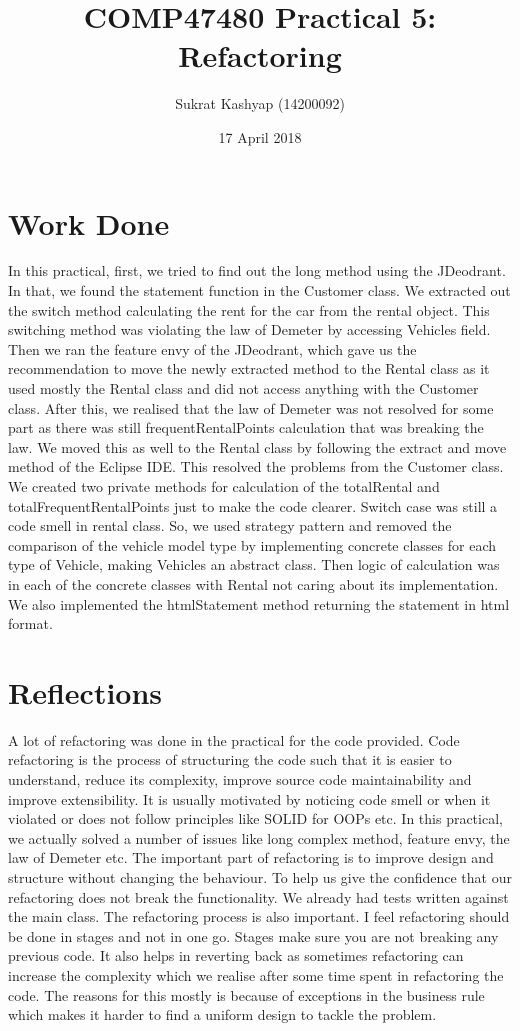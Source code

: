 \documentclass[11pt]{article}
\title{\vspace{-3.0cm}COMP47480 Practical 5: Refactoring}
\author{Sukrat Kashyap (14200092)}
\date{17 April 2018}
\begin{document}
\maketitle

\section{Work Done}

In this practical, first, we tried to find out the long method using the JDeodrant. In that, we found the statement function in the Customer class. We extracted out the switch method calculating the rent for the car from the rental object. This switching method was violating the law of Demeter by accessing Vehicles field. Then we ran the feature envy of the JDeodrant, which gave us the recommendation to move the newly extracted method to the Rental class as it used mostly the Rental class and did not access anything with the Customer class. After this, we realised that the law of Demeter was not resolved for some part as there was still frequentRentalPoints calculation that was breaking the law. We moved this as well to the Rental class by following the extract and move method of the Eclipse IDE. This resolved the problems from the Customer class. We created two private methods for calculation of the totalRental and totalFrequentRentalPoints just to make the code clearer. Switch case was still a code smell in rental class. So, we used strategy pattern and removed the comparison of the vehicle model type by implementing concrete classes for each type of Vehicle, making Vehicles an abstract class. Then logic of calculation was in each of the concrete classes with Rental not caring about its implementation. We also implemented the htmlStatement method returning the statement in html format.

\section{Reflections}

A lot of refactoring was done in the practical for the code provided. Code refactoring is the process of structuring the code such that it is easier to understand, reduce its complexity, improve source code maintainability and improve extensibility. It is usually motivated by noticing code smell or when it violated or does not follow principles like SOLID for OOPs etc. In this practical, we actually solved a number of issues like long complex method, feature envy, the law of Demeter etc. The important part of refactoring is to improve design and structure without changing the behaviour. To help us give the confidence that our refactoring does not break the functionality. We already had tests written against the main class. The refactoring process is also important. I feel refactoring should be done in stages and not in one go. Stages make sure you are not breaking any previous code. It also helps in reverting back as sometimes refactoring can increase the complexity which we realise after some time spent in refactoring the code. The reasons for this mostly is because of exceptions in the business rule which makes it harder to find a uniform design to tackle the problem.
\end{document}
